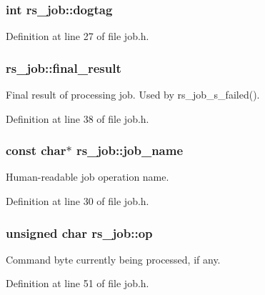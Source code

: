 \subsubsection[{dogtag}]{\setlength{\rightskip}{0pt plus 5cm}int rs\+\_\+job\+::dogtag}\label{structrs__job_a63f809ce5fec21d4bb6344e77b092f10}


Definition at line 27 of file job.\+h.

\hypertarget{structrs__job_abe5bd8bd64e63678da2efdf707736cce}{}
\subsubsection[{final\+\_\+result}]{ rs\+\_\+job\+::final\+\_\+result}\label{structrs__job_abe5bd8bd64e63678da2efdf707736cce}
Final result of processing job. Used by rs\+\_\+job\+\_\+s\+\_\+failed(). 

Definition at line 38 of file job.\+h.

\hypertarget{structrs__job_a1adfb711cdf2198c0f053db20b19292d}{}
\subsubsection[{job\+\_\+name}]{\setlength{\rightskip}{0pt plus 5cm}const char$\ast$ rs\+\_\+job\+::job\+\_\+name}\label{structrs__job_a1adfb711cdf2198c0f053db20b19292d}
Human-\/readable job operation name. 

Definition at line 30 of file job.\+h.

\hypertarget{structrs__job_a21558da1d932702b454731d99966c8b4}{}
\subsubsection[{op}]{\setlength{\rightskip}{0pt plus 5cm}unsigned char rs\+\_\+job\+::op}\label{structrs__job_a21558da1d932702b454731d99966c8b4}
Command byte currently being processed, if any. 

Definition at line 51 of file job.\+h.

\hypertarget{structrs__job_a29f5436987f3f517ad6d2dab32540d45}{}
